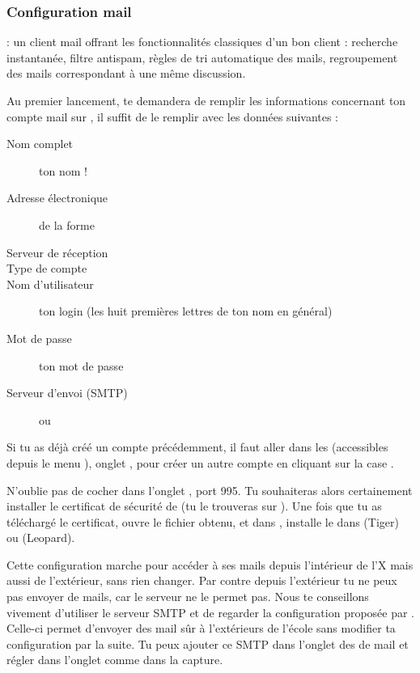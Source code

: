 \subsubsection{Configuration mail}

  : un client mail offrant les fonctionnalités classiques d'un bon client : recherche instantanée, filtre antispam, règles de tri automatique des mails, regroupement des mails correspondant à une même discussion.

Au premier lancement,  te demandera de remplir les informations concernant ton compte mail sur , il suffit de le remplir avec les données suivantes :

\begin{description}
  \item[Nom complet] ton nom !
  \item[Adresse électronique] de la forme 
  \item[Serveur de réception] 
  \item[Type de compte] 
  \item[Nom d'utilisateur] ton login  (les huit premières lettres de ton nom en général)
  \item[Mot de passe] ton mot de passe 
  \item[Serveur d'envoi (SMTP)]  ou 
\end{description}

Si tu as déjà créé un compte précédemment, il faut aller dans les  (accessibles depuis le menu ), onglet , pour créer un autre compte en cliquant sur la case \menu{+}.

N'oublie pas de cocher  dans l'onglet , port 995. Tu souhaiteras alors certainement installer le certificat de sécurité de  (tu le trouveras sur ). Une fois que tu as téléchargé le certificat, ouvre le fichier  obtenu, et dans , installe le dans  (Tiger) ou  (Leopard).

Cette configuration marche pour accéder à ses mails depuis l'intérieur de l'X mais aussi de l'extérieur, sans rien changer. Par contre depuis l'extérieur tu ne peux pas envoyer de mails, car le serveur  ne le permet pas. Nous te conseillons vivement d'utiliser le serveur SMTP  et de regarder la configuration proposée par . Celle-ci permet d'envoyer des mail sûr à l'extérieurs de l'école sans modifier ta configuration par la suite. Tu peux ajouter ce SMTP dans l'onglet  des  de mail et régler dans l'onglet  comme dans la capture.

